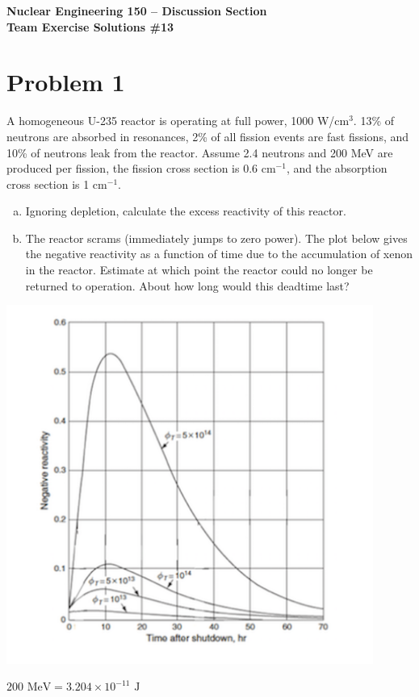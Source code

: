 \documentclass{report}
\begin{document}
\begin{center}
\textbf{\large Nuclear Engineering 150 -- Discussion Section}\\ 
\textbf{Team Exercise Solutions \#13}
\end{center}

\section*{Problem 1}

A homogeneous U-235 reactor is operating at full power, 1000 W/cm$^3$. 13\% of neutrons are absorbed in resonances, 2\% of all fission events are fast fissions, and 10\% of neutrons leak from the reactor. Assume 2.4 neutrons and 200 MeV are produced per fission, the fission cross section is 0.6 cm$^{-1}$, and the absorption cross section is 1 cm$^{-1}$.
\begin{enumerate}[a)]
\item Ignoring depletion, calculate the excess reactivity of this reactor.
\item The reactor scrams (immediately jumps to zero power). The plot below gives the negative reactivity as a function of time due to the accumulation of xenon in the reactor. Estimate at which point the reactor could no longer be returned to operation. About how long would this deadtime last?
\end{enumerate}
\begin{center}
\vspace{1cm}
\includegraphics[width=12cm]{xenon-deadtime}
\end{center}
\vfill
$200\text{ MeV} = 3.204\times10^{-11}\text{ J}$
\end{document}
